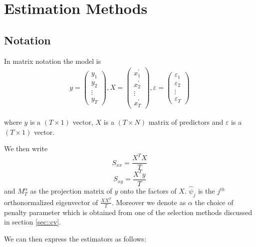 \section{Estimation Methods}

\subsection{Notation}

In matrix notation the model is 
\begin{align*}
y=\left(\begin{array}{c}
y_{1} \\
y_{2} \\
\vdots \\
y_{T}
\end{array}\right), X=\left(\begin{array}{c}
x_{1}^{\prime} \\
x_{2}^{\prime} \\
\vdots \\
x_{T}^{\prime}
\end{array}\right), \varepsilon=\left(\begin{array}{c}
\varepsilon_{1} \\
\varepsilon_{2} \\
\vdots \\
\varepsilon_{T}
\end{array}\right)
\end{align*}


where $y$ is a $(T \times 1)$ vector, $X$ is a $(T \times N)$ matrix of predictors and $\varepsilon$ is a $(T \times 1)$ vector.

We then write 
\[S_{xx} = \frac{X^{T} X}{T} \]
\[S_{xy} = \frac{X^{T} y}{T} \]
and 
$M_{T}^{\alpha}$ as the projection matrix of $y$ onto the factors of $X$. $\hat{\psi}_{j}$ is the  $j^{th}$ orthonormalized eigenvector of $\frac{X X^{T}}{T}$. Moreover we denote as $\alpha$ the choice of penalty parameter which is obtained from one of the selection methods discussed in section \ref{sec::cv}. 

We can then express the estimators as follows: 

